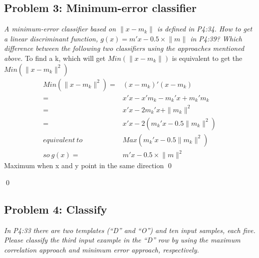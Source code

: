 \documentclass[
        ]{beamer}
\begin{document}
    \subsection{Problem 3: Minimum-error classifier}
        \begin{frame}[c]{\subsecname}
            \begin{overprint}            
            \emph{A minimum-error classifier based on $\lVert x - m_k \rVert$ is defined in P4:34. How to get a linear discriminant function, $g(x) = m' x - 0.5 \times \lVert m \rVert$ in P4:39? Which difference between the following two classifiers using the approaches mentioned above.}
            	\onslide<2>
            	To find a k, which will get $Min(\|x-m_k\|)$ is equivalent to get the $Min(\|x-m_k\|^2)$
                \begin{align*}
                    Min(\|x-m_k\|^2)   =&(x-m_k)'(x-m_k)\\
                                       =&x'x-x'm_k-m_k'x+m_k'm_k\\
                                       =&x'x-2m_k'x+\|m_k\|^2\\
                                       =&x'x-2(m_k'x-0.5\|m_k\|^2)\\
                    equivalent\ to\     &Max(m_k'x-0.5\|m_k\|^2)\\
                    so\ g(x)           =&m' x - 0.5 \times \lVert m \rVert^2   
                \end{align*}          
            	\onslide<3> 
            		\alert{Maximum when x and y point in the same direction}
            	\onslide<4>  %
            		\qed
            \end{overprint}       
        \end{frame}
        
        \begin{frame}[c]{\subsecname}
            \begin{overprint}
            	\onslide<2> %
            	\qed
            \end{overprint}   
        \end{frame}
        
    \subsection{Problem 4: Classify}
        \begin{frame}[c]{\subsecname}
            \emph{In P4:33 there are two templates (``D'' and ``O'') and ten input samples, each five. Please classify the third input example in the ``D'' row by using the maximum correlation approach and minimum error approach, respectively.}
        \end{frame}
        
\end{document}

